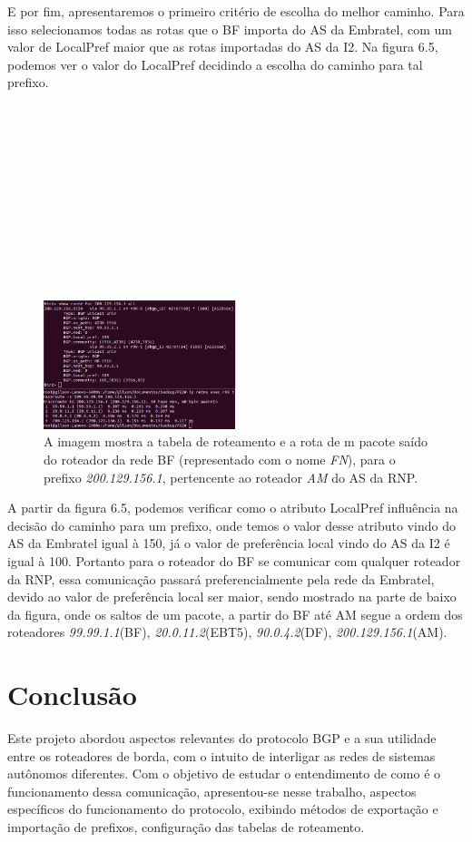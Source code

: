 \documentclass[12pt,a4paper]{report}
\begin{document}
E por fim, apresentaremos o primeiro crit\'erio de escolha do melhor caminho. Para isso selecionamos todas as rotas que o BF importa do AS da Embratel, com um valor de LocalPref maior que as rotas importadas do AS da I2. Na figura 6.5, podemos ver o valor do LocalPref decidindo a escolha do caminho para tal prefixo.
\\
\\
\\
\\
\\
\\
\\
\\
\\
\\
\\
\\
\begin{figure}[!htb]
 \centering
 \includegraphics[width=0.5\textwidth]{Imagens/figura65}
  \caption{\label{fig:imagem12} A imagem mostra a tabela de roteamento e a rota de m pacote sa\'ido do roteador da rede BF (representado com o nome \textit{FN}), para o prefixo \textit{200.129.156.1}, pertencente ao roteador \textit{AM} do AS da RNP.}
\end{figure}

A partir da figura 6.5, podemos verificar como o atributo LocalPref influ\^encia na decis\~ao do caminho para um prefixo, onde temos o valor desse atributo vindo do AS da Embratel igual \`a 150, j\'a o valor de prefer\^encia local vindo do AS da I2 \'e igual \`a 100. Portanto para o roteador do BF se comunicar com qualquer roteador da RNP, essa comunica\c{c}\~ao passar\'a preferencialmente pela rede da Embratel, devido ao valor de prefer\^encia local ser maior, sendo mostrado na parte de baixo da figura, onde os saltos de um pacote, a partir do BF at\'e AM segue a ordem dos roteadores \textit{99.99.1.1}(BF), \textit{20.0.11.2}(EBT5), \textit{90.0.4.2}(DF), \textit{200.129.156.1}(AM).

\chapter{Conclus\~ao}
Este projeto abordou aspectos relevantes do protocolo BGP e a sua utilidade entre os roteadores de borda, com o intuito de interligar as redes de sistemas aut\^onomos diferentes. Com o objetivo de estudar o entendimento de como \'e o funcionamento dessa comunica\c{c}\~ao, apresentou-se nesse trabalho, aspectos espec\'ificos do funcionamento do protocolo, exibindo m\'etodos de exporta\c{c}\~ao e importa\c{c}\~ao de prefixos, configura\c{c}\~ao das tabelas de roteamento.
\end{document}
